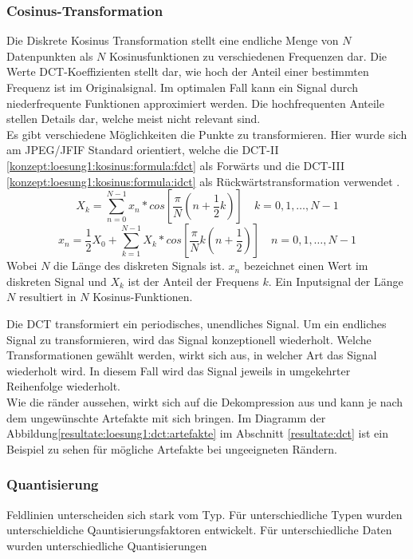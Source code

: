 \subsubsection{Cosinus-Transformation} \label{konzept:loesung1:kosinus}
Die Diskrete Kosinus Transformation stellt eine endliche Menge von $N$ Datenpunkten als $N$ Kosinusfunktionen zu verschiedenen Frequenzen dar. Die Werte DCT-Koeffizienten stellt dar, wie hoch der Anteil einer bestimmten Frequenz ist im Originalsignal. Im optimalen Fall kann ein Signal durch niederfrequente Funktionen approximiert werden. Die hochfrequenten Anteile stellen Details dar, welche meist nicht relevant sind.\\
Es gibt verschiedene Möglichkeiten die Punkte zu transformieren. Hier wurde sich am JPEG/JFIF Standard orientiert, welche die DCT-II \eqref{konzept:loesung1:kosinus:formula:fdct} als Forwärts und die DCT-III \eqref{konzept:loesung1:kosinus:formula:idct} als Rückwärtstransformation verwendet \cite{wallace1992jpeg}. 
\begin{equation} \label{konzept:loesung1:kosinus:formula:fdct}
	X_k = \sum_{n=0}^{N-1}x_n*cos[\frac{\pi}{N}(n+\frac{1}{2}k)] \quad k = 0, 1, \ldots, N-1
\end{equation}
\begin{equation} \label{konzept:loesung1:kosinus:formula:idct}
x_n  = \frac{1}{2}X_0 + \sum_{k=1}^{N-1}X_k*cos[\frac{\pi}{N}k(n+\frac{1}{2})] \quad n = 0,1,\ldots,N-1
\end{equation}
Wobei $N$ die Länge des diskreten Signals ist. $x_n$ bezeichnet einen Wert im diskreten Signal und $X_k$ ist der Anteil der Frequens $k$. Ein Inputsignal der Länge $N$ resultiert in $N$ Kosinus-Funktionen.

Die DCT transformiert ein periodisches, unendliches Signal. Um ein endliches Signal zu transformieren, wird das Signal konzeptionell wiederholt. Welche Transformationen gewählt werden, wirkt sich aus, in welcher Art das Signal wiederholt wird. In diesem Fall wird das Signal jeweils in umgekehrter Reihenfolge wiederholt.\\
Wie die ränder aussehen, wirkt sich auf die Dekompression aus und kann je nach dem ungewünschte Artefakte mit sich bringen. Im Diagramm der Abbildung\ref{resultate:loesung1:dct:artefakte} im Abschnitt \ref{resultate:dct} ist ein Beispiel zu sehen für mögliche Artefakte bei ungeeigneten Rändern. 


\subsubsection{Quantisierung}
Feldlinien unterscheiden sich stark vom Typ. Für unterschiedliche Typen wurden unterschieldiche Qauntisierungsfaktoren entwickelt.
Für unterschiedliche Daten wurden unterschiedliche Quantisierungen 

